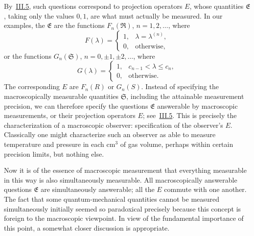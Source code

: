 \documentclass[fontsize=13pt,twoside,openany,headings=normal,parskip=false,bookmarkpackage=false,DIV=calc]{scrbook}
\begin{document}
By~\hyperref[sec:III.5]{III.5}, such questions correspond to projection operators $E$, whose quantities $\mathfrak E$, taking only the values $0,1$, are what must actually be measured. In our examples, the $\mathfrak E$ are the functions $F_n(\mathfrak R)$, $n=1,2,\ldots$, where
\[
F(\lambda)=\begin{cases}1,&\lambda=\lambda^{(n)},\\0,&\text{otherwise},\end{cases}
\]
or the functions $G_n(\mathfrak S)$, $n=0,\pm1,\pm2,\ldots$, where
\[
G(\lambda)=\begin{cases}1,&c_{n-1}<\lambda\leq c_n,\\0,&\text{otherwise}.\end{cases}
\]
The corresponding $E$ are $F_n(R)$ or $G_n(S)$. Instead of specifying the macroscopically measurable quantities $\mathfrak S$, including the attainable measurement precision, we can therefore specify the questions $\mathfrak E$ answerable by macroscopic measurements, or their projection operators $E$; see~\hyperref[sec:III.5]{III.5}. This is precisely the characterization of a macroscopic observer: specification of the observer's $E$. Classically one might characterize such an observer as able to measure temperature and pressure in each $\mathrm{cm}^3$ of gas volume, perhaps within certain precision limits, but nothing else.

Now it is of the essence of macroscopic measurement that everything measurable in this way is also simultaneously measurable. All macroscopically answerable questions $\mathfrak E$ are simultaneously answerable; all the $E$ commute with one another. The fact that some quantum-mechanical quantities cannot be measured simultaneously initially seemed so paradoxical precisely because this concept is foreign to the macroscopic viewpoint. In view of the fundamental importance of this point, a somewhat closer discussion is appropriate.
\end{document}
